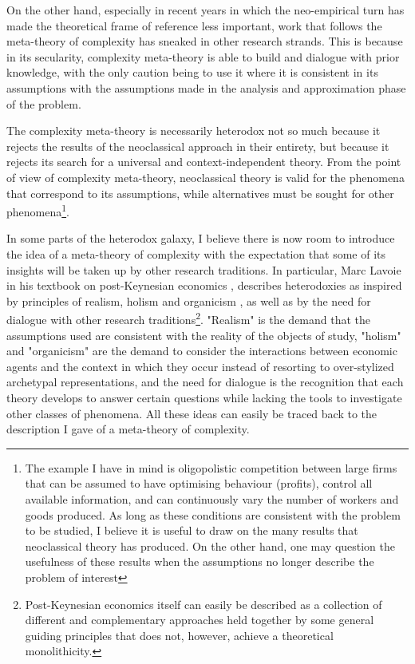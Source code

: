 \documentclass[a4paper, headings=standardclasses]{scrartcl}
\begin{document}
On the other hand, especially in recent years in which the neo-empirical turn has made the theoretical frame of reference less important, work that follows the meta-theory of complexity has sneaked in other research strands.
This is because in its secularity, complexity meta-theory is able to build and dialogue with prior knowledge, with the only caution being to use it where it is consistent in its assumptions with the assumptions made in the analysis and approximation phase of the problem.

The complexity meta-theory is necessarily heterodox not so much because it rejects the results of the neoclassical approach in their entirety, but because it rejects its search for a universal and context-independent theory.
From the point of view of complexity meta-theory, neoclassical theory is valid for the phenomena that correspond to its assumptions, while alternatives must be sought for other phenomena\footnote{The example I have in mind is oligopolistic competition between large firms that can be assumed to have optimising behaviour (profits), control all available information, and can continuously vary the number of workers and goods produced. As long as these conditions are consistent with the problem to be studied, I believe it is useful to draw on the many results that neoclassical theory has produced. On the other hand, one may question the usefulness of these results when the assumptions no longer describe the problem of interest}.

In some parts of the heterodox galaxy, I believe there is now room to introduce the idea of a meta-theory of complexity with the expectation that some of its insights will be taken up by other research traditions.
In particular, Marc Lavoie in his textbook on post-Keynesian economics \parencite{lavoie2022}, describes heterodoxies as inspired by principles of realism, holism and organicism \parencite[][p. 12]{lavoie2022}, as well as by the need for dialogue with other research traditions\footnote{Post-Keynesian economics itself can easily be described as a collection of different and complementary approaches held together by some general guiding principles that does not, however, achieve a theoretical monolithicity.}. "Realism" is the demand that the assumptions used are consistent with the reality of the objects of study, "holism" and "organicism" are the demand to consider the interactions between economic agents and the context in which they occur instead of resorting to over-stylized archetypal representations, and the need for dialogue is the recognition that each theory develops to answer certain questions while lacking the tools to investigate other classes of phenomena.
All these ideas can easily be traced back to the description I gave of a meta-theory of complexity. 
\end{document}
